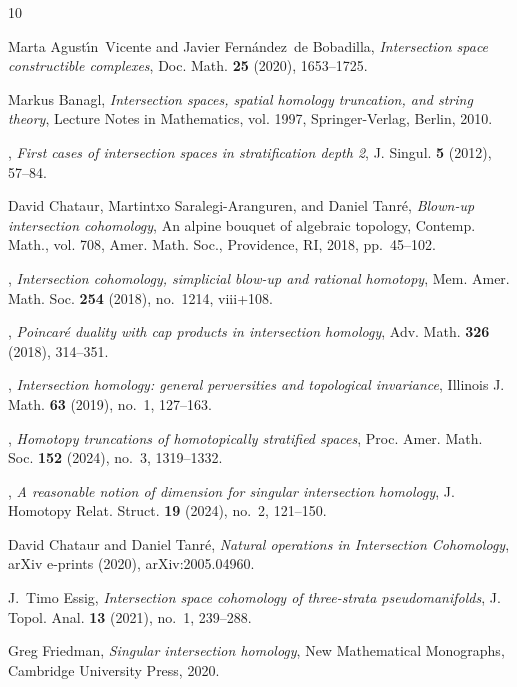 \documentclass[a4paper,10pt,english,reqno]{amsart}
\theoremstyle{plain}
\theoremstyle{definition}
\theoremstyle{remark}
\numberwithin{equation}{section}
\renewcommand\1{\hbox{\ding{192}}}
\renewcommand\2{\hbox{\ding{193}}}
\newcommand\3{\hbox{\ding{194}}}
\newcommand\4{\hbox{\ding{195}}}
\begin{document}
\begin{thebibliography}{10}

Marta Agust\'{\i}n~Vicente and Javier Fern\'{a}ndez~de Bobadilla,
  \emph{Intersection space constructible complexes}, Doc. Math. \textbf{25}
  (2020), 1653--1725. 

Markus Banagl, \emph{Intersection spaces, spatial homology truncation, and
  string theory}, Lecture Notes in Mathematics, vol. 1997, Springer-Verlag,
  Berlin, 2010. 

\bysame, \emph{First cases of intersection spaces in stratification depth 2},
  J. Singul. \textbf{5} (2012), 57--84. 

David Chataur, Martintxo Saralegi-Aranguren, and Daniel Tanr\'e, \emph{Blown-up
  intersection cohomology}, An alpine bouquet of algebraic topology, Contemp.
  Math., vol. 708, Amer. Math. Soc., Providence, RI, 2018, pp.~45--102.

\bysame, \emph{Intersection cohomology, simplicial blow-up and rational
  homotopy}, Mem. Amer. Math. Soc. \textbf{254} (2018), no.~1214, viii+108.

\bysame, \emph{Poincar\'e duality with cap products in intersection homology},
  Adv. Math. \textbf{326} (2018), 314--351. 

\bysame, \emph{Intersection homology: general perversities and topological
  invariance}, Illinois J. Math. \textbf{63} (2019), no.~1, 127--163.

\bysame, \emph{Homotopy truncations of homotopically stratified spaces}, Proc.
  Amer. Math. Soc. \textbf{152} (2024), no.~3, 1319--1332. 

\bysame, \emph{A reasonable notion of dimension for singular intersection
  homology}, J. Homotopy Relat. Struct. \textbf{19} (2024), no.~2, 121--150.

David {Chataur} and Daniel {Tanr{\'e}}, \emph{{Natural operations in
  Intersection Cohomology}}, arXiv e-prints (2020), arXiv:2005.04960.

J.~Timo Essig, \emph{Intersection space cohomology of three-strata
  pseudomanifolds}, J. Topol. Anal. \textbf{13} (2021), no.~1, 239--288.

Greg Friedman, \emph{Singular intersection homology}, New Mathematical
  Monographs, Cambridge University Press, 2020.


\end{thebibliography}
\end{document}

